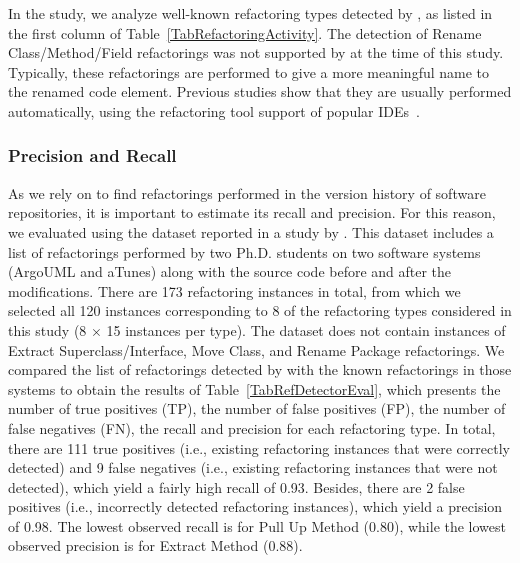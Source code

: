 In the study, we analyze  well-known refactoring types detected by \toolName, as listed in the first column of Table~\ref{TabRefactoringActivity}.
The detection of {\textsc Rename Class/Method/Field} refactorings was not supported by \toolName at the time of this study.
Typically, these refactorings are performed to give a more meaningful name to the renamed code element. Previous studies show that they are usually performed automatically, using the refactoring tool support of popular IDEs~\citep{MurphyHill2012, negara2013}.



\subsubsection{\toolName Precision and Recall}
\label{sec:precision_recall}
As we rely on \toolName to find refactorings performed in the version history of software repositories,
it is important to estimate its recall and precision. For this reason, we evaluated \toolName using the dataset reported in a study by \cite{Chaparro:2014}.
This dataset includes a list of refactorings performed by two Ph.D. students on two software systems (ArgoUML 
and aTunes) along with the source code before and after the modifications. 
There are 173 refactoring instances in total, from which we selected all 120 instances corresponding to 8 of the refactoring types considered in this study (8 $\times$ 15 instances per type).
The dataset does not contain instances of {\textsc Extract Superclass/Interface}, {\textsc Move Class}, and {\textsc Rename Package} refactorings.
We compared the list of refactorings detected by \toolName with the known refactorings in those systems to 
obtain the results of Table~\ref{TabRefDetectorEval}, which presents the number of true positives (TP), 
the number of false positives (FP), the number of false negatives (FN), the recall and precision for each 
refactoring type.
In total, there are 111 true positives (i.e., existing refactoring instances that were correctly detected) and 9 false negatives (i.e., existing refactoring instances that were not detected), which yield a fairly high recall of 0.93.
Besides, there are 2 false positives (i.e., incorrectly detected refactoring instances), which yield a precision of 0.98.
The lowest observed recall is for {\textsc Pull Up Method} (0.80), while the lowest observed precision is for {\textsc Extract Method} (0.88).

